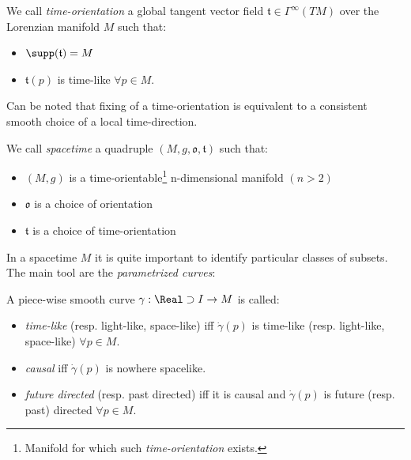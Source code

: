 \documentclass[Main]{subfiles}
\begin{document}
			\begin{definition}
				We call \emph{time-orientation} a global tangent vector field  $\mathfrak{t}\in \Gamma^\infty(TM)$ over the Lorenzian manifold $M$ 
				such that:
				\begin{itemize}
					\item $\supp(\mathfrak{t}) = M$
					\item $\mathfrak{t}(p)$ is time-like $\forall p \in M$.
				\end{itemize}
			\end{definition}
				Can be noted that fixing of a time-orientation is equivalent to a consistent smooth choice of a local time-direction.
	
			\begin{definition}
				We call \emph{spacetime} a quadruple $(M, g, \mathfrak{o}, \mathfrak{t})$ such that:
				\begin{itemize}
					\item $(M,g)$ is a time-orientable\footnote{Manifold for which such \emph{time-orientation} exists.} n-dimensional manifold $(n>2)$
					\item $\mathfrak{o}$ is a choice of orientation
					\item $\mathfrak{t}$ is a choice of time-orientation
				\end{itemize}
			\end{definition}	
		
			In a spacetime $M$ it is quite important to identify particular classes of subsets. The main tool are the \emph{parametrized curves}:
			\begin{notationfix}

				A piece-wise smooth curve $\gamma: \Real\supset I \rightarrow M$ is called:
				\begin{itemize}
					\item \emph{time-like} (resp. light-like, space-like) iff $\dot{\gamma}(p)$ is time-like (resp. light-like, space-like) $\forall p \in M$.
					\item \emph{causal} iff $\dot{\gamma}(p)$ is nowhere spacelike.
					\item \emph{future directed} (resp. past directed) iff it is causal and  $\dot{\gamma}(p)$ is future (resp. past) directed $\forall p \in M$.
				\end{itemize}
			\end{notationfix}
\end{document}

